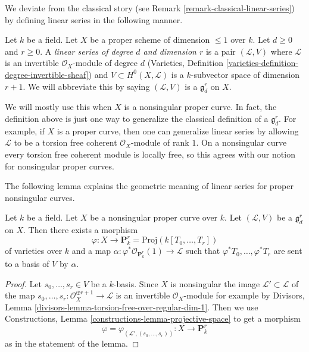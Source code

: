 \noindent
We deviate from the classical story
(see Remark \ref{remark-classical-linear-series})
by defining linear series in the following manner.

\begin{definition}
\label{definition-linear-series}
Let $k$ be a field. Let $X$ be a proper scheme of dimension $\leq 1$ over $k$.
Let $d \geq 0$ and $r \geq 0$.
A {\it linear series of degree $d$ and dimension $r$}
is a pair $(\mathcal{L}, V)$ where $\mathcal{L}$ is an
invertible $\mathcal{O}_X$-module of degree $d$
(Varieties, Definition \ref{varieties-definition-degree-invertible-sheaf})
and $V \subset H^0(X, \mathcal{L})$ is a $k$-subvector space
of dimension $r + 1$. We will abbreviate this by saying
$(\mathcal{L}, V)$ is a {\it $\mathfrak g^r_d$} on $X$.
\end{definition}

\noindent
We will mostly use this when $X$ is a nonsingular proper curve.
In fact, the definition above is just one way to generalize the
classical definition of a $\mathfrak g^r_d$. For example, if $X$
is a proper curve, then one can generalize linear series by allowing
$\mathcal{L}$ to be a torsion free coherent $\mathcal{O}_X$-module
of rank $1$. On a nonsingular curve every torsion free
coherent module is locally free, so this agrees with our
notion for nonsingular proper curves.

\medskip\noindent
The following lemma explains the geometric meaning of linear series
for proper nonsingular curves.

\begin{lemma}
\label{lemma-linear-series}
Let $k$ be a field. Let $X$ be a nonsingular proper curve over $k$.
Let $(\mathcal{L}, V)$ be a $\mathfrak g^r_d$ on $X$. Then
there exists a morphism
$$
\varphi : X \longrightarrow \mathbf{P}^r_k = \text{Proj}(k[T_0, \ldots, T_r])
$$
of varieties over $k$ and a map
$\alpha : \varphi^*\mathcal{O}_{\mathbf{P}^r_k}(1) \to \mathcal{L}$
such that $\varphi^*T_0, \ldots, \varphi^*T_r$
are sent to a basis of $V$ by $\alpha$.
\end{lemma}

\begin{proof}
Let $s_0, \ldots, s_r \in V$ be a $k$-basis. Since $X$ is nonsingular
the image $\mathcal{L}' \subset \mathcal{L}$ of the map
$s_0, \ldots, s_r : \mathcal{O}_X^{\oplus r + 1} \to \mathcal{L}$
is an invertible $\mathcal{O}_X$-module for example by
Divisors, Lemma \ref{divisors-lemma-torsion-free-over-regular-dim-1}.
Then we use
Constructions, Lemma \ref{constructions-lemma-projective-space}
to get a morphism
$$
\varphi = \varphi_{(\mathcal{L}', (s_0, \ldots, s_r))} :
X \longrightarrow \mathbf{P}^r_k
$$
as in the statement of the lemma.
\end{proof}

